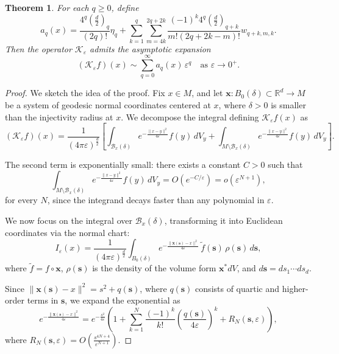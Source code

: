 \documentclass{amsart}
\theoremstyle{Theorem}
\newtheorem{thm}[theorem]{Theorem}
\theoremstyle{remark}
\numberwithin{equation}{section} \numberwithin{figure}{section}
\renewcommand*{\to}{\rightarrow}
\begin{document}
\begin{thm}
For each \( q \geq 0 \), define
\[
a_q(x) = \frac{4^q \left( \frac{d}{2} \right)_q}{(2q)!} \eta_q
+ \sum_{k=1}^{q} \sum_{m=4k}^{2q+2k} \frac{(-1)^k 4^q \left( \frac{d}{2} \right)_{q+k}}{m!(2q+2k - m)!} w_{q+k, m, k}.
\]
Then the operator \( \mathcal{K}_\varepsilon \) admits the asymptotic expansion
\[
(\mathcal{K}_\varepsilon f)(x) \sim \sum_{q=0}^{\infty} a_q(x) \, \varepsilon^q \quad \text{as } \varepsilon \to 0^+.
\]
\end{thm}
\begin{proof}
We sketch the idea of the proof. Fix \( x \in M \), and let \( \mathbf{x}: B_0(\delta) \subset \mathbb{R}^d \to M \) be a system of geodesic normal coordinates centered at \( x \), where \( \delta > 0 \) is smaller than the injectivity radius at \( x \). We decompose the integral defining \( \mathcal{K}_\varepsilon f(x) \) as
\[
(\mathcal{K}_\varepsilon f)(x) = \frac{1}{(4\pi\varepsilon)^{\frac{d}{2}}} \left[ \int_{\mathcal{B}_x(\delta)} e^{ -\frac{ \| x - y \|^2 }{4\varepsilon} } f(y) \, dV_y + \int_{M \setminus \mathcal{B}_x(\delta)} e^{ -\frac{ \| x - y \|^2 }{4\varepsilon} } f(y) \, dV_y \right].
\]

The second term is exponentially small: there exists a constant \( C > 0 \) such that
\[
\int_{M \setminus \mathcal{B}_x(\delta)} e^{ -\frac{ \| x - y \|^2 }{4\varepsilon} } f(y) \, dV_y = O(e^{-C/\varepsilon}) = o(\varepsilon^{N+1}),
\]
for every \( N \), since the integrand decays faster than any polynomial in \( \varepsilon \).

We now focus on the integral over \( \mathcal{B}_x(\delta) \), transforming it into Euclidean coordinates via the normal chart:
\[
I_\varepsilon(x) = \frac{1}{(4\pi\varepsilon)^{\frac{d}{2}}} \int_{B_0(\delta)} e^{- \frac{ \| \mathbf{x}(\mathbf{s}) - x \|^2 }{4\varepsilon} } \, \widetilde{f}(\mathbf{s}) \, \rho(\mathbf{s}) \, d\mathbf{s},
\]
where \( \widetilde{f} = f \circ \mathbf{x} \), \( \rho(\mathbf{s}) \) is the density of the volume form \( \mathbf{x}^* dV \), and \( d\mathbf{s} = ds_1 \cdots ds_d \).

Since \( \| \mathbf{x}(\mathbf{s}) - x \|^2 = s^2 + q(\mathbf{s}) \), where \( q(\mathbf{s})\)                                                                                                                                                                  consists of quartic and higher-order terms in \( \mathbf{s} \), we expand the exponential as
\[
e^{ - \frac{ \| \mathbf{x}(\mathbf{s}) - x \|^2 }{4\varepsilon} } 
= e^{ - \frac{s^2}{4\varepsilon} } \left( 1 + \sum_{k=1}^{N} \frac{ (-1)^k }{k!} \left( \frac{ q(\mathbf{s}) }{4\varepsilon} \right)^k + R_N(\mathbf{s},\varepsilon) \right),
\]
where \( R_N(\mathbf{s}, \varepsilon) = O\left( \frac{s^{4N+4}}{\varepsilon^{N+1}} \right) \).


\end{proof}
\end{document}
